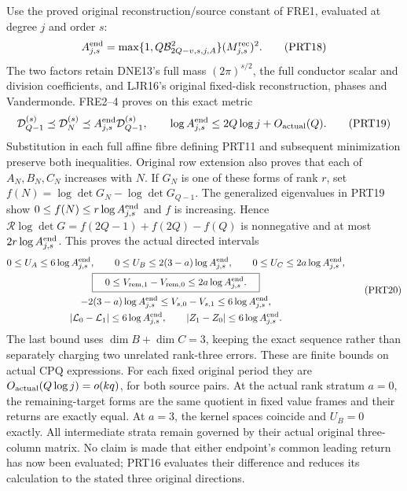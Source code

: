 Use the proved original reconstruction/source constant of FRE1,
evaluated at degree $j$ and order $s$:
\[
 A_{j,s}^{\rm end}=
 \max\{1,Q\mathcal B_{2Q-v,s,j,A}^{2}\}
                    (M_{j,s}^{\rm rec})^2.
 \tag{PRT18}
\]
The two factors retain DNE13's full mass $(2\pi)^{s/2}$,
the full conductor scalar and division coefficients, and LJR16's
original fixed-disk reconstruction, phases and Vandermonde.
FRE2--4 proves on this exact metric
\[
 \mathcal D_{Q-1}^{(s)}\preceq\mathcal D_N^{(s)}
   \preceq A_{j,s}^{\rm end}\mathcal D_{Q-1}^{(s)},
 \qquad
 \log A_{j,s}^{\rm end}\le2Q\log j+O_{\rm actual}(Q).
 \tag{PRT19}
\]
Substitution in each full affine fibre defining PRT11 and subsequent
minimization preserve both inequalities. Original row extension also
proves that each of $A_N,B_N,C_N$ increases with $N$.
If $G_N$ is one of these forms of rank $r$, set
$f(N)=\log\det G_N-\log\det G_{Q-1}$.
The generalized eigenvalues in PRT19 show $0\le f(N)\le
r\log A_{j,s}^{\rm end}$ and $f$ is increasing. Hence
$\mathcal R\log\det G=f(2Q-1)+f(2Q)-f(Q)$ is nonnegative
and at most $2r\log A_{j,s}^{\rm end}$.
This proves the actual directed intervals
\[
 \begin{gathered}
 0\le U_A\le6\log A_{j,s}^{\rm end},\qquad
 0\le U_B\le2(3-a)\log A_{j,s}^{\rm end},\qquad
 0\le U_C\le2a\log A_{j,s}^{\rm end},\\
 \boxed{\quad0\le V_{{\rm rem},1}-V_{{\rm rem},0}
                   \le2a\log A_{j,s}^{\rm end}.\quad}\\
 -2(3-a)\log A_{j,s}^{\rm end}
 \le V_{s,0}-V_{s,1}\le6\log A_{j,s}^{\rm end},\\
 |\mathcal L_0-\mathcal L_1|\le6\log A_{j,s}^{\rm end},
 \qquad |Z_1-Z_0|\le6\log A_{j,s}^{\rm end}.
 \end{gathered}\tag{PRT20}
\]
The last bound uses $\dim B+\dim C=3$, keeping the exact
sequence rather than separately charging two unrelated rank-three
errors. These are finite bounds on actual CPQ expressions.
For each fixed original period they are
$O_{\rm actual}(Q\log j)=o(kq)$, for both source pairs.
At the actual rank stratum $a=0$, the remaining-target forms are
the same quotient in fixed value frames and their returns are exactly
equal. At $a=3$, the kernel spaces coincide and $U_B=0$ exactly.
All intermediate strata remain governed by their actual original
three-column matrix. No claim is made that either endpoint's common
leading return has now been evaluated; PRT16 evaluates their difference
and reduces its calculation to the stated three original directions.

